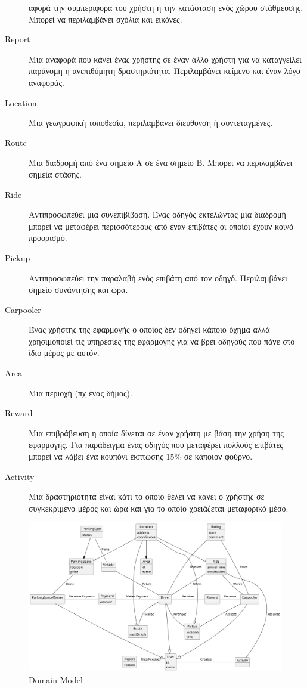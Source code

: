 \documentclass[11pt]{article}
\begin{document}
\begin{description}
        αφορά την συμπεριφορά του χρήστη ή την κατάσταση ενός χώρου
        στάθμευσης. Μπορεί να περιλαμβάνει σχόλια και εικόνες.
    \item[Report]
        Μια αναφορά που κάνει ένας χρήστης σε έναν άλλο χρήστη για να
        καταγγείλει παράνομη η ανεπιθύμητη δραστηριότητα. Περιλαμβάνει
        κείμενο και έναν λόγο αναφοράς.
    \item[Location]
        Μια γεωγραφική τοποθεσία, περιλαμβάνει διεύθυνση ή συντεταγμένες.
    \item[Route]
        Μια διαδρομή από ένα σημείο Α σε ένα σημείο Β. Μπορεί να περιλαμβάνει
        σημεία στάσης.
    \item[Ride]
        Αντιπροσωπεύει μια συνεπιβίβαση. Ένας οδηγός εκτελώντας μια διαδρομή
        μπορεί να μεταφέρει περισσότερους από έναν επιβάτες οι οποίοι έχουν
        κοινό προορισμό.
    \item[Pickup]
        Αντιπροσωπεύει την παραλαβή ενός επιβάτη από τον οδηγό. Περιλαμβάνει
        σημείο συνάντησης και ώρα.
    \item[Carpooler]
        Ένας χρήστης της εφαρμογής ο οποίος δεν οδηγεί κάποιο όχημα αλλά
        χρησιμοποιεί τις υπηρεσίες της εφαρμογής για να βρει οδηγούς που πάνε
        στο ίδιο μέρος με αυτόν.
    \item[Area]
        Μια περιοχή (πχ ένας δήμος).
    \item[Reward]
        Μια επιβράβευση η οποία δίνεται σε έναν χρήστη με βάση την χρήση της
        εφαρμογής. Για παράδειγμα ένας οδηγός που μεταφέρει πολλούς επιβάτες
        μπορεί να λάβει ένα κουπόνι έκπτωσης 15\% σε κάποιον φούρνο.
    \item[Activity]
        Μια δραστηριότητα είναι κάτι το οποίο θέλει να κάνει ο χρήστης σε
        συγκεκριμένο μέρος και ώρα και για το οποίο χρειάζεται μεταφορικό μέσο.
\end{description}

\begin{figure}
    \centering
    \includegraphics[width=\textwidth]{domain-model}
    \caption{Domain Model}
\end{figure}
\end{document}
